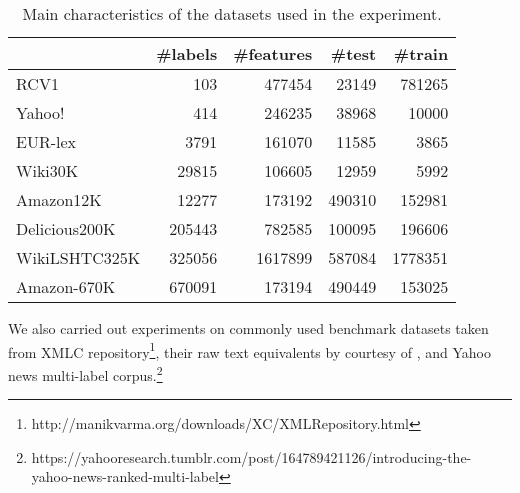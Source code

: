 \documentclass{article}
\begin{document}
\begin{table}[t!]
\vspace{-.1cm}
        \caption{Main characteristics of the datasets used in the experiment.}
        \label{tab:datasets-differences-table}
        \begin{center}
                \begin{small}
                        \begin{tabular}{l@{\hskip 4pt} | r@{\hskip 4pt} r@{\hskip 4pt} r@{\hskip 4pt} r} %
                                \toprule
& \#labels &\#features &\#test &\#train \\%
\midrule
RCV1 & 103 & 477454 & 23149 & 781265 \\%
Yahoo! & 414 & 246235 & 38968 & 10000 \\%
EUR-lex & 3791 & 161070 & 11585 & 3865 \\%
Wiki30K & 29815 & 106605 & 12959 & 5992 \\%
Amazon12K & 12277 & 173192 & 490310 & 152981 \\%
Delicious200K & 205443 & 782585 & 100095 & 196606 \\%
WikiLSHTC325K & 325056 & 1617899 & 587084 & 1778351 \\%
Amazon-670K & 670091 & 173194 & 490449 & 153025 \\%
                                \bottomrule
                        \end{tabular}
                \end{small}
        \end{center}
                        \vspace{-0.3cm}
\end{table}
%
We also carried out experiments on commonly used benchmark datasets taken from XMLC repository\footnote{http://manikvarma.org/downloads/XC/XMLRepository.html}, their raw text equivalents by courtesy of \cite{Liu_et_al_2017}, and Yahoo news multi-label corpus.\footnote{https://yahooresearch.tumblr.com/post/164789421126/introducing-the-yahoo-news-ranked-multi-label}
\end{document}
